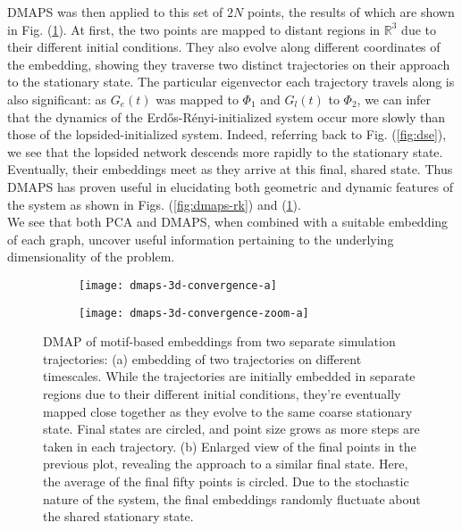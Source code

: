 \documentclass[epjST, final]{svjour}
\begin{document}
\begin{onehalfspace}
DMAPS was then applied to this set of $2N$ points, the results of
which are shown in Fig. (\ref{fig:dmaps-results}). At first, the two
points are mapped to distant regions in $\mathbb{R}^3$ due to their
different initial conditions. They also evolve along different
coordinates of the embedding, showing they traverse two distinct
trajectories on their approach to the stationary state. The particular
eigenvector each trajectory travels along is also significant: as
$G_e(t)$ was mapped to $\Phi_1$ and $G_l(t)$ to $\Phi_2$, we can infer
that the dynamics of the Erd\H{o}s-R\'{e}nyi-initialized system occur
more slowly than those of the lopsided-initialized system. Indeed,
referring back to Fig. (\ref{fig:dse}), we see that the lopsided
network descends more rapidly to the stationary state. Eventually,
their embeddings meet as they arrive at this final, shared state. Thus
DMAPS has proven useful in elucidating both geometric and dynamic
features of the system as shown in Figs. (\ref{fig:dmaps-rk}) and (\ref{fig:dmaps-results}). \\

We see that both PCA and DMAPS, when combined with a suitable embedding of each graph, uncover useful information pertaining to the underlying dimensionality of the problem.


\begin{figure}[h!]
  \vspace{-5mm}
  \centering
  \begin{subfigure}{0.49\textwidth}
    \centering
    \texttt{[image: dmaps-3d-convergence-a]}
    \subcaption{\label{fig:dmaps-results-regular}}
  \end{subfigure} %
  \begin{subfigure}{0.49\textwidth}
    \centering
    \texttt{[image: dmaps-3d-convergence-zoom-a]}
    \subcaption{\label{fig:dmaps-results-zoom}}
  \end{subfigure}%
  \caption{DMAP of motif-based embeddings from two separate simulation
    trajectories: (a) embedding of two trajectories on different
    timescales. While the trajectories are initially embedded in
    separate regions due to their different initial conditions,
    they're eventually mapped close together as they evolve to the
    same coarse stationary state. Final states are circled, and point
    size grows as more steps are taken in each trajectory. (b)
    Enlarged view of the final points in the previous plot, revealing
    the approach to a similar final state. Here, the average of the
    final fifty points is circled. Due to the stochastic nature of
    the system, the final embeddings randomly fluctuate about the
    shared stationary state. \label{fig:dmaps-results}}
\end{figure}


\end{onehalfspace}
\end{document}

